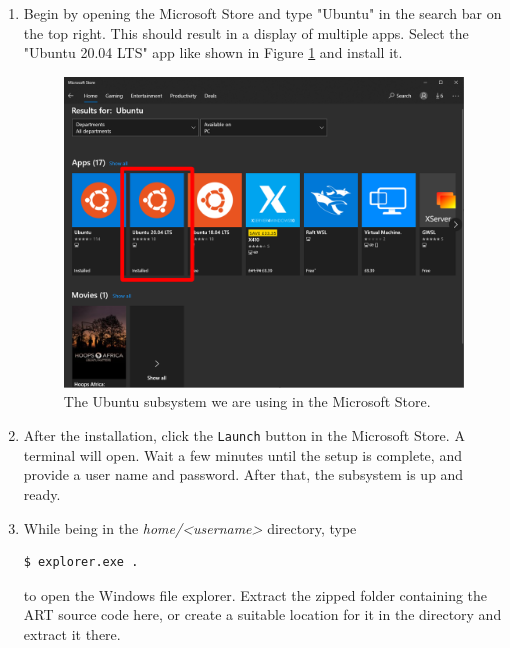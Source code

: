 \begin{enumerate}
	
	\item Begin by opening the Microsoft Store and type "Ubuntu" in the search bar on the top right. This should result in a display of multiple apps. Select the "Ubuntu 20.04 LTS" app like shown in Figure \ref{fig:ubuntu} and install it.
	\begin{figure}[h]
		\centering
		\includegraphics[width=.8\linewidth]{img/appendix/ubuntu.png}
		\caption{The Ubuntu subsystem we are using in the Microsoft Store.}
		\label{fig:ubuntu}
	\end{figure}
	
	\item After the installation, click the \texttt{Launch} button in the Microsoft Store. A terminal will open. Wait a few minutes until the setup is complete, and provide a user name and password.
	After that, the subsystem is up and ready.
	
	\item While being in the \emph{home/<username>} directory, type
\begin{Verbatim}
$ explorer.exe .
\end{Verbatim}
	to open the Windows file explorer. Extract the zipped folder containing the ART source code here, or create a suitable location for it in the directory and extract it there.
	

\end{enumerate}

